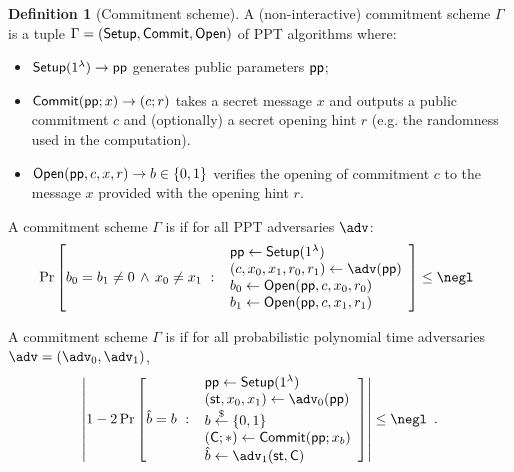 \documentclass{article}
\theoremstyle{definition}
\newtheorem{definition}{Definition}
\newcommand{\ben}[1]{{\textcolor{green}{[Ben: #1]}}}
\newcommand{\alan}[1]{{\todo[color=blue!40!white]{Alan: #1}}}
\newcommand{\ben}[1]{}
\newcommand{\alan}[1]{}
\begin{document}
\begin{definition}[Commitment scheme]
A (non-interactive) commitment scheme $\Gamma$ is a tuple $\Gamma = (\textsf{{Setup}}, \textsf{{Commit}}, \textsf{{Open}})$ of PPT algorithms where:
\begin{itemize}
    \item $\textsf{{Setup}}(1^\lambda) \rightarrow \textsf{pp}$ generates public parameters $\textsf{pp}$;
    \item $\textsf{{Commit}}(\textsf{pp}; x) \rightarrow (c; r)$ takes a secret message $x$ and outputs a public commitment $c$ and (optionally) a secret opening hint $r$ (e.g. the randomness used in the computation).
    \item $\textsf{{Open}}(\textsf{pp}, c, x, r) \rightarrow b \in \{0, 1\}$ verifies the opening of commitment $c$ to the message $x$ provided with the opening hint $r$. 
\end{itemize}

A commitment scheme $\Gamma$ is  if for all PPT adversaries $\adv$:
\[
    \Pr\left[
        b_0 = b_1 \neq 0 \, \wedge \, x_0 \neq x_1 \ : \
        \begin{array}{l}
             \params \gets \pro{Setup}(1^\lambda) \\
             (c, x_0, x_1, r_0, r_1) \gets \adv(\params) \\
             b_0 \gets \pro{Open}(\params, c, x_0, r_0) \\
             b_1 \gets \pro{Open}(\params, c, x_1, r_1) \\
        \end{array}
    \right] \leq \negl \enspace 
\]


A commitment scheme $\Gamma$ is  if for all probabilistic polynomial time adversaries $\adv=(\adv_0,\adv_1)$,
\[
    \left|
        1 - 2\Pr\left[
            \hat{b} = b \ : \
        \begin{array}{l}
             \params \gets \pro{Setup}(1^\lambda) \\
             (\state, x_0, x_1) \gets \adv_0(\params) \\
             b \sample \{0,1\} \\
             (\gr{C}; *) \gets \pro{Commit}(\params; x_b) \\
             \hat{b} \gets \adv_1(\state, \gr{C})
        \end{array}
        \right]
    \right| \leq \negl \enspace .
\]
\end{definition}
\end{document}

